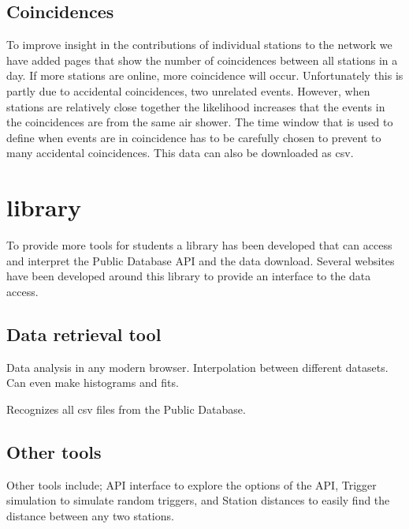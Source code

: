 \subsection{Coincidences}

To improve insight in the contributions of individual stations to the
\hisparc network we have added pages that show the number of
coincidences between all \hisparc stations in a day. If more stations
are online, more coincidence will occur. Unfortunately this is partly
due to accidental coincidences, two unrelated events. However, when
stations are relatively close together the likelihood increases that the
events in the coincidences are from the same air shower. The time window
that is used to define when events are in coincidence has to be
carefully chosen to prevent to many accidental coincidences. This data
can also be downloaded as csv.


\section{\jsparc \javascript library}

To provide more tools for students a \javascript library has been
developed that can access and interpret the Public Database API and the
data download. Several websites have been developed around this library
to provide an interface to the data access.


\subsection{Data retrieval tool}

Data analysis in any modern browser.
Interpolation between different datasets. Can even make histograms and fits.

Recognizes all csv files from the Public Database.


\subsection{Other tools}

Other tools include; API interface to explore the options of the API,
Trigger simulation to simulate random triggers, and Station distances to
easily find the distance between any two stations.

